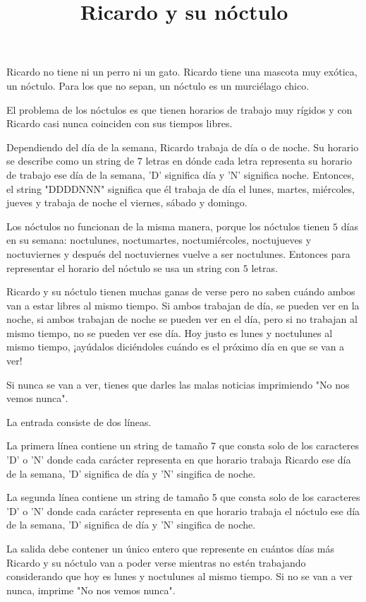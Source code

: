 \documentclass{oci}
\title{Ricardo y su nóctulo}
\begin{document}
\begin{problemDescription}
Ricardo no tiene ni un perro ni un gato. Ricardo tiene una mascota muy exótica, un nóctulo. Para los que no sepan, un nóctulo es un murciélago chico.

El problema de los nóctulos es que tienen horarios de trabajo muy rígidos y con Ricardo casi nunca coinciden con sus tiempos libres.

Dependiendo del día de la semana, Ricardo trabaja de día o de noche. Su horario se describe como un string de $7$ letras en dónde cada letra representa su horario de trabajo ese día de la semana, 'D' significa día y 'N' significa noche. Entonces, el string "DDDDNNN" significa que él trabaja de día el lunes, martes, miércoles, jueves y trabaja de noche el viernes, sábado y domingo.

Los nóctulos no funcionan de la misma manera, porque los nóctulos tienen $5$ días en su semana: noctulunes, noctumartes, noctumiércoles, noctujueves y noctuviernes y después del noctuviernes vuelve a ser noctulunes. Entonces para representar el horario del nóctulo se usa un string con $5$ letras.

Ricardo y su nóctulo tienen muchas ganas de verse pero no saben cuándo ambos van a estar libres al mismo tiempo. Si ambos trabajan de día, se pueden ver en la noche, si ambos trabajan de noche se pueden ver en el día, pero si no trabajan al mismo tiempo, no se pueden ver ese día. Hoy justo es lunes y noctulunes al mismo tiempo, ¡ayúdalos diciéndoles cuándo es el próximo día en que se van a ver!

Si nunca se van a ver, tienes que darles las malas noticias imprimiendo "No nos vemos nunca".
\end{problemDescription}

\begin{inputDescription}
La entrada consiste de dos líneas.

La primera línea contiene un string de tamaño 7 que consta solo de los caracteres 'D' o 'N' donde cada carácter representa en que horario trabaja Ricardo ese día de la semana, 'D' significa de día y 'N' singifica de noche.

La segunda línea contiene un string de tamaño 5 que consta solo de los caracteres 'D' o 'N' donde cada carácter representa en que horario trabaja el nóctulo ese día de la semana, 'D' significa de día y 'N' singifica de noche.
\end{inputDescription}

\begin{outputDescription}
La salida debe contener un único entero que represente en cuántos días más Ricardo y su nóctulo van a poder verse mientras no estén trabajando considerando que hoy es lunes y noctulunes al mismo tiempo. Si no se van a ver nunca, imprime "No nos vemos nunca".
\end{outputDescription}
\end{document}
